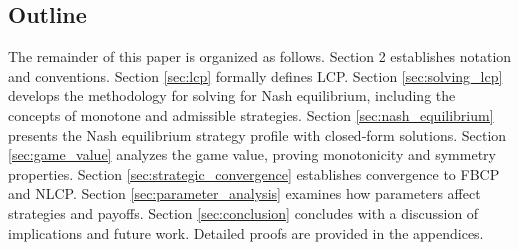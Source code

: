 \documentclass[../../main/main.tex]{subfiles}
\begin{document}
\subsection{Outline}

The remainder of this paper is organized as follows. Section 2 establishes notation and conventions. Section \ref{sec:lcp} formally defines LCP. Section \ref{sec:solving_lcp} develops the methodology for solving for Nash equilibrium, including the concepts of monotone and admissible strategies. Section \ref{sec:nash_equilibrium} presents the Nash equilibrium strategy profile with closed-form solutions. Section \ref{sec:game_value} analyzes the game value, proving monotonicity and symmetry properties. Section \ref{sec:strategic_convergence} establishes convergence to FBCP and NLCP. Section \ref{sec:parameter_analysis} examines how parameters affect strategies and payoffs. Section \ref{sec:conclusion} concludes with a discussion of implications and future work. Detailed proofs are provided in the appendices.
\end{document}

